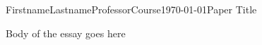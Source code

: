 \documentclass[12pt, letterpaper]{article}
\begin{document}
\begin{mla}{Firstname}{Lastname}{Professor}{Course}{\today}{Paper Title}

	Body of the essay goes here

\end{mla}
\end{document}
